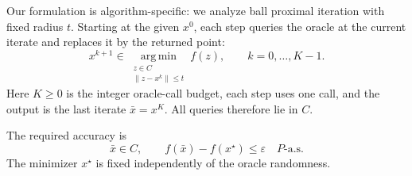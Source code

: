 \documentclass[10pt]{article}
\theoremstyle{definition}
\begin{document}
Our formulation is algorithm-specific: we analyze ball proximal iteration with fixed radius $t$. Starting at the given $x^0$, each step queries the oracle at the current iterate and replaces it by the returned point:
\[
x^{k+1}\in\operatorname*{arg\,min}_{\substack{z\in C\\\|z-x^k\|\leq t}} f(z),
\qquad k=0,\ldots,K-1.
\]
Here $K\geq0$ is the integer oracle-call budget, each step uses one call, and the output is the last iterate $\bar{x}=x^K$. All queries therefore lie in $C$.

The required accuracy is
\[
\bar{x}\in C,
\qquad f(\bar{x})-f(x^\star)\leq\varepsilon
\quad P\text{-a.s.}
\]
The minimizer $x^\star$ is fixed independently of the oracle randomness.
\end{document}
